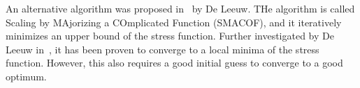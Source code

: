 An alternative algorithm was proposed in~\cite{MDS_proposal} by De Leeuw. THe algorithm is called Scaling by MAjorizing a COmplicated Function (SMACOF), and it iteratively minimizes an upper bound of the stress function. Further investigated by De Leeuw in~\cite{SMACOF_convergence}, it has been proven to converge to a local minima of the stress function. However, this also requires a good initial guess to converge to a good optimum. 





